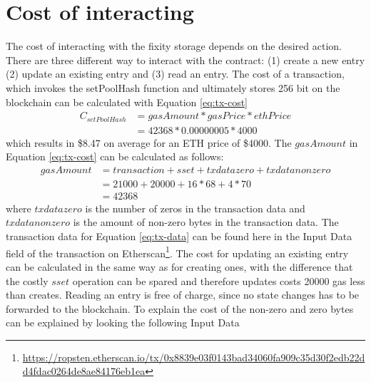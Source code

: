 \section{Cost of interacting}\label{sec:cost-interating}
The cost of interacting with the fixity storage depends on the desired action. There are three different way to interact with the contract: (1) create a new entry (2) update an existing entry and (3) read an entry.
The cost of a transaction, which invokes the setPoolHash function and ultimately stores 256 bit on the blockchain can be calculated with Equation \ref{eq:tx-cost}
\begin{equation}\label{eq:tx-cost}
    \begin{split}
        C_{setPoolHash} & = gasAmount * gasPrice * ethPrice \\ 
        & = 42368 * 0.00000005 * 4000
    \end{split}
\end{equation}
which results in \$8.47 on average for an ETH price of \$4000.
The $gasAmount$ in Equation \ref{eq:tx-cost} can be calculated as follows:
\begin{equation}\label{eq:tx-data}
  \begin{split}
    gasAmount & = transaction + sset + txdatazero + txdatanonzero \\
     & = 21000 + 20000 + 16 * 68 + 4 * 70  \\
     & = 42368
  \end{split}
\end{equation}
where $txdatazero$ is the number of zeros in the transaction data and $txdatanonzero$ is the amount of non-zero bytes in the transaction data. The transaction data for Equation \ref{eq:tx-data} can be found here in the Input Data field of the transaction on Etherscan\footnote{\url{https://ropsten.etherscan.io/tx/0x8839e03f0143bad34060fa909c35d30f2edb22dd4fdac0264de8ae84176eb1ea}}.
The cost for updating an existing entry can be calculated in the same way as for creating ones, with the difference that the costly $sset$ operation can be spared and therefore updates costs 20000 gas less than creates.
Reading an entry is free of charge, since no state changes has to be forwarded to the blockchain.
To explain the cost of the non-zero and zero bytes can be explained by looking the following Input Data


